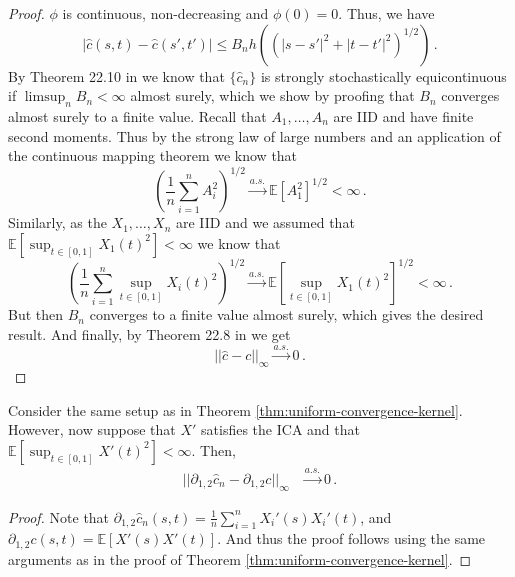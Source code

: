 \begin{proof}
    $\phi$ is continuous, non-decreasing and $\phi(0) = 0$. Thus, we have
    \[
        |\hat{c}(s, t) - \hat{c}(s', t')| \leq B_n h\left((|s - s'|^2 + |t - t'|^2)^{1/2}\right) \,.
    \]
    By Theorem 22.10 in
    \cite{davidson2021} we know that $\{\hat{c}_n \}$ is strongly stochastically equicontinuous if
    $\limsup_n B_n < \infty$ almost surely, which we show by proofing that $B_n$ converges almost
    surely to a finite value. Recall that $A_1, \dots, A_n$ are IID and have finite second moments.
    Thus by the strong law of large numbers and an application of the continuous mapping theorem we
    know that
    \[
        \left(\frac{1}{n} \sum_{i=1}^n A_i^2\right)^{1/2} \overset{a.s.}{\to}
        \mathbb{E}[A_1^2]^{1/2} < \infty \,.
    \]
    Similarly, as the $X_1, \dots, X_n$ are IID and we assumed that $\mathbb{E}[\sup_{t \in [0, 1]}
    X_1(t)^2] < \infty$ we know that
    \[
        \left(\frac{1}{n} \sum_{i=1}^n \sup_{t \in [0, 1]} X_i(t)^2\right)^{1/2} \overset{a.s.}{\to}
        \mathbb{E}[\sup_{t \in [0, 1]} X_1(t)^2]^{1/2} < \infty \,.
    \]
    But then $B_n$ converges to a finite value almost surely, which gives the desired result. And
    finally, by Theorem 22.8 in \cite{davidson2021} we get
    \[
        ||\hat{c} - c||_\infty \overset{a.s.}{\to} 0 \,.
    \]
\end{proof}

\begin{theorem}\label{thm:uniform-convergence-kernel-derivative}
    Consider the same setup as in Theorem \ref{thm:uniform-convergence-kernel}. However, now suppose
    that $X'$ satisfies the ICA and that $\mathbb{E}[\sup_{t \in [0, 1]} X'(t)^2] < \infty$. Then,
    \begin{align}
        || \partial_{1, 2}\hat{c}_n - \partial_{1, 2}c ||_\infty &\overset{a.s.}{\to} 0 \,.
    \end{align}
\end{theorem}
\begin{proof}
    Note that $\partial_{1, 2} \hat{c}_n(s, t) = \frac{1}{n} \sum_{i = 1}^n X_i'(s) X_i'(t)$, and
    $\partial_{1, 2} c(s, t) = \mathbb{E}[X'(s) X'(t)]$. And thus the proof follows using the same
    arguments as in the proof of Theorem \ref{thm:uniform-convergence-kernel}.
\end{proof}


